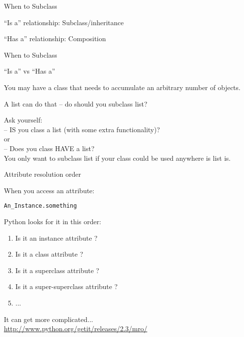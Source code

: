 \documentclass{beamer}
\begin{document}
\begin{frame}[fragile]{When to Subclass}

\vfill
{\Large ``Is a'' relationship: Subclass/inheritance}

\vfill
{\Large ``Has a'' relationship: Composition}
\end{frame}

\begin{frame}[fragile]{When to Subclass}

{\Large ``Is a'' vs ``Has a'' }

\vfill
You may have a class that needs to accumulate an arbitrary number of objects.

\vfill
A list can do that -- do should you subclass list?

\vfill
Ask yourself:\\

\vfill
-- IS you class a list (with some extra functionality)?\\
\hspace{0.4in}or\\
-- Does you class HAVE a list?\\

\vfill
You only want to subclass list if your class could be used anywhere is list is.
\end{frame}

\begin{frame}[fragile]{Attribute resolution order}

{\Large When you access an attribute:

\vfill
\hspace{0.2in}\verb|An_Instance.something|}

\vfill
{\Large Python looks for it in this order:}

\vfill
\begin{enumerate}
  \item Is it an instance attribute ?
  \item Is it a class attribute ?
  \item Is it a superclass attribute ?
  \item Is it a super-superclass attribute ?
  \item ...
\end{enumerate}

\vfill
It can get more complicated...\\
\url{http://www.python.org/getit/releases/2.3/mro/}
\end{frame} 
\end{document}
